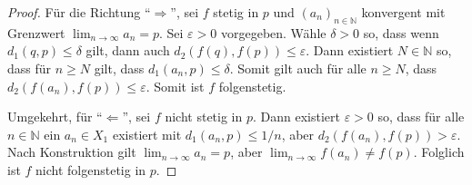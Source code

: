\documentclass[../main.tex]{subfiles}
\begin{document}
\begin{proof}
  Für die Richtung ``$\Rightarrow$'',
  sei $f$ stetig in $p$ und ${(a_{n})}_{n \in \mathbb{N}}$
  konvergent mit Grenzwert
  $\lim_{n \to \infty} a_n = p$.
  Sei $\varepsilon > 0$ vorgegeben.
  Wähle $\delta > 0$ so, dass wenn
  $d_1(q, p) \leq \delta$ gilt,
  dann auch $d_2(f(q), f(p)) \leq \varepsilon$.
  Dann existiert $N \in \mathbb{N}$ so,
  dass für $n \geq N$ gilt, dass
  $d_1(a_n, p) \leq \delta$.
  Somit gilt auch für alle $n \geq N$,
  dass $d_2(f(a_n), f(p)) \leq \varepsilon$.
  Somit ist $f$ folgenstetig.

  Umgekehrt, für ``$\Leftarrow$'',
  sei $f$ nicht stetig in $p$.
  Dann existiert $\varepsilon > 0$ so,
  dass für alle $n \in \mathbb{N}$ ein
  $a_n \in X_1$ existiert mit
  $d_1(a_n, p) \leq 1/n$, aber
  $d_2(f(a_n), f(p)) > \varepsilon$.
  Nach Konstruktion gilt
  $\lim_{n \to \infty}a_n = p$,
  aber $\lim_{n \to \infty}f(a_n) \neq f(p)$.
  Folglich ist $f$ nicht folgenstetig in $p$.
\end{proof}
\end{document}
